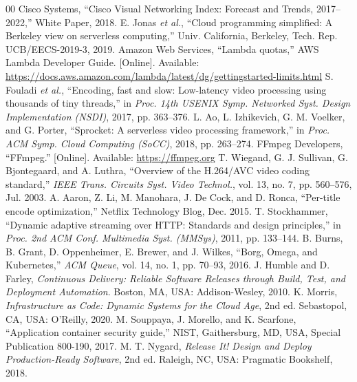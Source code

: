 \documentclass[conference]{IEEEtran}
\begin{document}
\begin{thebibliography}{00}
 Cisco Systems, ``Cisco Visual Networking Index: Forecast and Trends, 2017--2022,'' White Paper, 2018.
 E. Jonas \textit{et al.}, ``Cloud programming simplified: A Berkeley view on serverless computing,'' Univ. California, Berkeley, Tech. Rep. UCB/EECS-2019-3, 2019.
 Amazon Web Services, ``Lambda quotas,'' AWS Lambda Developer Guide. [Online]. Available: \url{https://docs.aws.amazon.com/lambda/latest/dg/gettingstarted-limits.html}
 S. Fouladi \textit{et al.}, ``Encoding, fast and slow: Low-latency video processing using thousands of tiny threads,'' in \textit{Proc. 14th USENIX Symp. Networked Syst. Design Implementation (NSDI)}, 2017, pp. 363--376.
 L. Ao, L. Izhikevich, G. M. Voelker, and G. Porter, ``Sprocket: A serverless video processing framework,'' in \textit{Proc. ACM Symp. Cloud Computing (SoCC)}, 2018, pp. 263--274.
 FFmpeg Developers, ``FFmpeg.'' [Online]. Available: \url{https://ffmpeg.org}
 T. Wiegand, G. J. Sullivan, G. Bjontegaard, and A. Luthra, ``Overview of the H.264/AVC video coding standard,'' \textit{IEEE Trans. Circuits Syst. Video Technol.}, vol. 13, no. 7, pp. 560--576, Jul. 2003.
 A. Aaron, Z. Li, M. Manohara, J. De Cock, and D. Ronca, ``Per-title encode optimization,'' Netflix Technology Blog, Dec. 2015.
 T. Stockhammer, ``Dynamic adaptive streaming over HTTP: Standards and design principles,'' in \textit{Proc. 2nd ACM Conf. Multimedia Syst. (MMSys)}, 2011, pp. 133--144.
 B. Burns, B. Grant, D. Oppenheimer, E. Brewer, and J. Wilkes, ``Borg, Omega, and Kubernetes,'' \textit{ACM Queue}, vol. 14, no. 1, pp. 70--93, 2016.
 J. Humble and D. Farley, \textit{Continuous Delivery: Reliable Software Releases through Build, Test, and Deployment Automation}. Boston, MA, USA: Addison-Wesley, 2010.
 K. Morris, \textit{Infrastructure as Code: Dynamic Systems for the Cloud Age}, 2nd ed. Sebastopol, CA, USA: O'Reilly, 2020.
 M. Souppaya, J. Morello, and K. Scarfone, ``Application container security guide,'' NIST, Gaithersburg, MD, USA, Special Publication 800-190, 2017.
 M. T. Nygard, \textit{Release It! Design and Deploy Production-Ready Software}, 2nd ed. Raleigh, NC, USA: Pragmatic Bookshelf, 2018.

\end{thebibliography}
\end{document}
